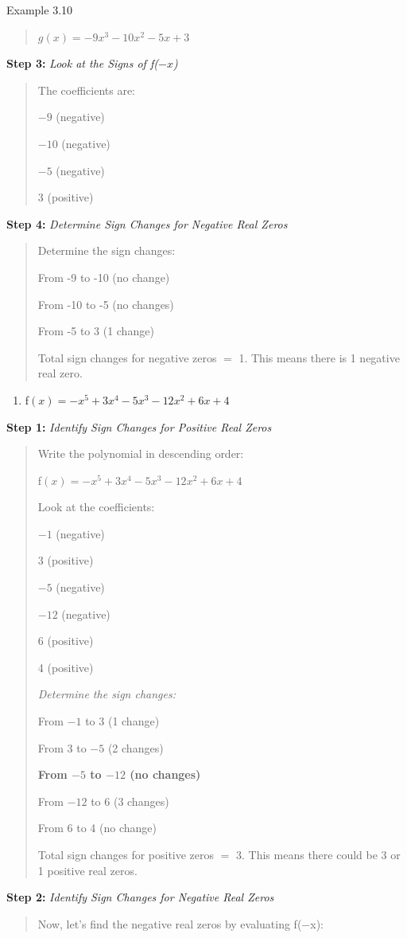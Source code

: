 \begin{example}{Example 3.10}
\begin{quote}
$g(x) = -9x^3 - 10x^2 - 5x + 3$
\end{quote}
\textbf{Step 3:} \textit{Look at the Signs of f($-x$)}
\begin{quote}
The coefficients are:

$-9$ (negative)

$-10$ (negative)

$-5$ (negative)

3 (positive)
\end{quote}
\textbf{Step 4:} \textit{Determine Sign Changes for Negative Real Zeros}
\begin{quote}
Determine the sign changes:

From -9 to -10 (no change)

From -10 to -5 (no changes)

From -5 to 3 (1 change)

Total sign changes for negative zeros $=$ 1. This means there is 1 negative
real zero.
\end{quote}
\begin{enumerate}
  \item[c.] f$(x) = -x^5 + 3x^4 - 5x^3 - 12x^2 + 6x + 4$
\end{enumerate}
\textbf{Step 1:} \textit{Identify Sign Changes for Positive Real Zeros}
\begin{quote}
Write the polynomial in descending order:

f$(x) = -x^5 + 3x^4 - 5x^3 - 12x^2 + 6x + 4$

Look at the coefficients:

$-1$ (negative)

3 (positive)

$-5$ (negative)

$-12$ (negative)

6 (positive)

4 (positive)

\textit{Determine the sign changes:}

From $-1$ to 3 (1 change)

From 3 to $-5$ (2 changes)

\textbf{From $-5$ to $-12$ (no changes)}

From $-12$ to 6 (3 changes)

From 6 to 4 (no change)

Total sign changes for positive zeros $=$ 3. This means there could be 3 or 1
positive real zeros.
\end{quote}
\textbf{Step 2:} \textit{Identify Sign Changes for Negative Real Zeros}
\begin{quote}
Now, let's find the negative real zeros by evaluating f($-$x):


\end{quote}
\end{example}
